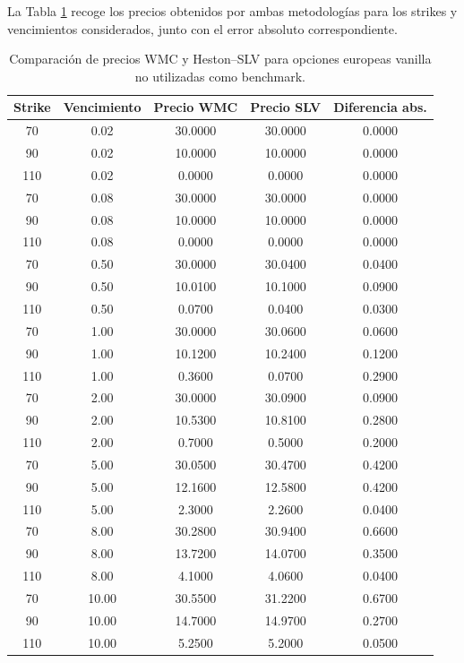 La Tabla \ref{tab:comparacion_vanilla_precios} recoge los precios obtenidos por
ambas metodologías para los strikes y vencimientos considerados, junto con el error
absoluto correspondiente.

\begin{table}[H]
\centering
\scriptsize
\begin{tabular}{|c|c|c|c|c|}
\hline
\textbf{Strike} & \textbf{Vencimiento} & \textbf{Precio WMC} & \textbf{Precio SLV} & \textbf{Diferencia abs.} \\
\hline
70  & 0.02  & 30.0000 & 30.0000 & 0.0000 \\
90  & 0.02  & 10.0000 & 10.0000 & 0.0000 \\
110 & 0.02  & 0.0000  & 0.0000  & 0.0000 \\
70  & 0.08  & 30.0000 & 30.0000 & 0.0000 \\
90  & 0.08  & 10.0000 & 10.0000 & 0.0000 \\
110 & 0.08  & 0.0000  & 0.0000  & 0.0000 \\
70  & 0.50  & 30.0000 & 30.0400 & 0.0400 \\
90  & 0.50  & 10.0100 & 10.1000 & 0.0900 \\
110 & 0.50  & 0.0700  & 0.0400  & 0.0300 \\
70  & 1.00  & 30.0000 & 30.0600 & 0.0600 \\
90  & 1.00  & 10.1200 & 10.2400 & 0.1200 \\
110 & 1.00  & 0.3600  & 0.0700  & 0.2900 \\
70  & 2.00  & 30.0000 & 30.0900 & 0.0900 \\
90  & 2.00  & 10.5300 & 10.8100 & 0.2800 \\
110 & 2.00  & 0.7000  & 0.5000  & 0.2000 \\
70  & 5.00  & 30.0500 & 30.4700 & 0.4200 \\
90  & 5.00  & 12.1600 & 12.5800 & 0.4200 \\
110 & 5.00  & 2.3000  & 2.2600  & 0.0400 \\
70  & 8.00  & 30.2800 & 30.9400 & 0.6600 \\
90  & 8.00  & 13.7200 & 14.0700 & 0.3500 \\
110 & 8.00  & 4.1000  & 4.0600  & 0.0400 \\
70  & 10.00 & 30.5500 & 31.2200 & 0.6700 \\
90  & 10.00 & 14.7000 & 14.9700 & 0.2700 \\
110 & 10.00 & 5.2500  & 5.2000  & 0.0500 \\
\hline
\end{tabular}
\caption{Comparación de precios WMC y Heston--SLV para opciones europeas vanilla no utilizadas como benchmark.}
\label{tab:comparacion_vanilla_precios}
\end{table}

